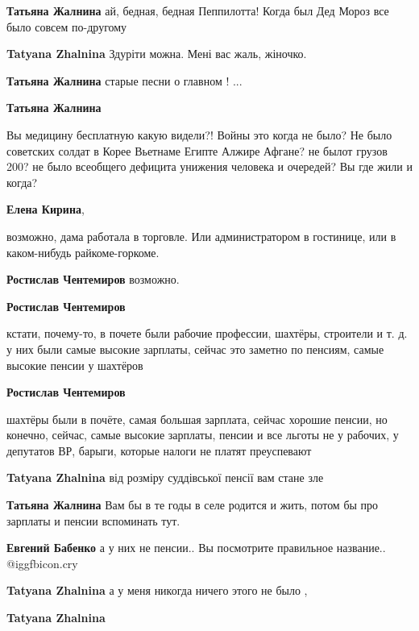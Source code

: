 \begin{itemize}
\begin{itemize} %
\textbf{Татьяна Жалнина} ай, бедная, бедная Пеппилотта! Когда был Дед Мороз все было совсем по-другому

\textbf{Tatyana Zhalnina} Здуріти можна. Мені вас жаль, жіночко.

\textbf{Татьяна Жалнина} старые песни о главном ! ...

\textbf{Татьяна Жалнина} 

Вы медицину бесплатную какую видели?! Войны это когда не было? Не было
советских солдат в Корее Вьетнаме Египте Алжире Афгане? не былот грузов 200? не
было всеобщего дефицита унижения человека и очередей? Вы где жили и когда?

\begin{itemize} %
\textbf{Елена Кирина}, 

возможно, дама работала в торговле. Или администратором в гостинице, или в
каком-нибудь райкоме-горкоме.


\textbf{Ростислав Чентемиров} возможно.

\textbf{Ростислав Чентемиров} 

кстати, почему-то, в почете были рабочие профессии, шахтёры, строители и т. д. у
них были самые высокие зарплаты, сейчас это заметно по пенсиям, самые высокие
пенсии у шахтёров

\textbf{Ростислав Чентемиров} 

шахтёры были в почёте, самая большая зарплата, сейчас хорошие пенсии, но
конечно, сейчас, самые высокие зарплаты, пенсии и все льготы не у рабочих, у
депутатов ВР, барыги, которые налоги не платят преуспевают

\textbf{Tatyana Zhalnina} від розміру суддівської пенсії вам стане зле

\textbf{Татьяна Жалнина} Вам бы в те годы в селе родится и жить, потом бы про зарплаты и пенсии вспоминать тут.

\textbf{Евгений Бабенко} а у них не пенсии..
Вы посмотрите правильное название..  @igg{fbicon.cry} 
\end{itemize} %

\textbf{Tatyana Zhalnina} а у меня никогда ничего этого не было ,

\textbf{Tatyana Zhalnina} 


\end{itemize}
\end{itemize}
